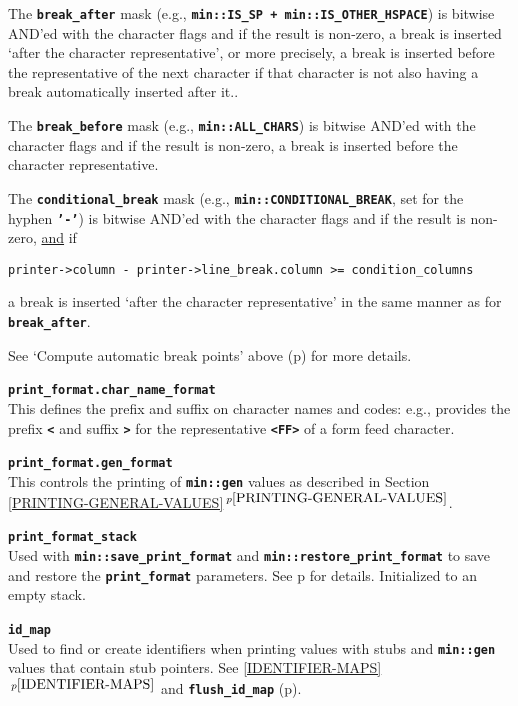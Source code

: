\documentclass[12pt]{article}
\makeatletter
\newcommand{\TT}[1]{{\tt \bfseries #1}}
\newcommand{\ttmkey}[2]{\TT{#1}\index{#1@{\tt #1}!#2}}
\newcommand{\itemref}[1]{\ref{#1}$\,^{p\pageref{#1}}$}
\newcommand{\pagref}[1]{p\pageref{#1}}
\newcommand{\EOL}{\penalty \exhyphenpenalty}
\newenvironment{itemlist}[1][1.2in]%
	{\begin{list}{}{\setlength{\labelwidth}{#1}%
		        \setlength{\leftmargin}{\labelwidth}%
		        \addtolength{\leftmargin}{+0.2in}%
		        \renewcommand{\makelabel}[1]{##1\hfill}}}%
	{\end{list}}
\makeatother
\begin{document}
\begin{itemlist}[0.6in]
The \TT{break\_\EOL after} mask\label{BREAK-AFTER}
(e.g., \TT{min::\EOL IS\_\EOL SP + min::\EOL IS\_\EOL OTHER\_\EOL HSPACE})
is bitwise AND'ed with
the character flags and if the result is non-zero,
a break is inserted `after the character representative', or
more precisely, a break is inserted before the representative
of the next character if that character is not also having
a break automatically inserted after it..

The \TT{break\_\EOL before} mask
(e.g., \TT{min::ALL\_CHARS})
is bitwise AND'ed with
the character flags and if the result is non-zero,
a break is inserted before the character representative.

The \TT{conditional\_\EOL break} mask\label{CONDITIONAL-BREAK}
(e.g., \TT{min::\EOL CONDITIONAL\_\EOL BREAK}, set for the hyphen \TT{'-'})
is bitwise AND'ed with
the character flags and if the result is non-zero,
\underline{and} if
\begin{center}
\tt printer->column - printer->line\_break.column >= condition\_columns
\end{center}
a break is inserted `after the character representative' in the
same manner as for \TT{break\_\EOL after}.

See `Compute automatic break points' above
(\pagref{COMPUTE-AUTOMATIC-BREAK-POINTS}) for more details.

\item[\ttmkey{print\_format.char\_name\_format}{in {\tt min::printer}}]%
\label{PRINT_FORMAT_CHAR_NAME_FORMAT}~\\
This defines the prefix and suffix on character names and
codes: e.g., provides the prefix \TT{<} and suffix \TT{>} for
the representative \TT{<FF>} of a form feed character.

\item[\ttmkey{print\_format.gen\_format}{in {\tt min::printer}}]~\\
This controls the printing of
\TT{min::gen} values as described in Section \itemref{PRINTING-GENERAL-VALUES}.

\item[\ttmkey{print\_\EOL format\_\EOL stack}{in {\tt min::printer}}]~\\
Used with \TT{min::save\_print\_format} and
\TT{min::\EOL restore\_\EOL print\_\EOL format} to save and
restore the \TT{print\_\EOL format} parameters.
See \pagref{PRINT-FORMAT-STACK} for details.
Initialized to an empty stack.

\item[\ttmkey{id\_\EOL map}{in {\tt min::printer}}]~\\
Used to find or create identifiers when printing values with stubs
and \TT{min::gen} values that contain stub pointers.
See \itemref{IDENTIFIER-MAPS} and
\TT{flush\_\EOL id\_\EOL map} (\pagref{MIN::FLUSH_ID_MAP}).

\end{itemlist}
\end{document}
